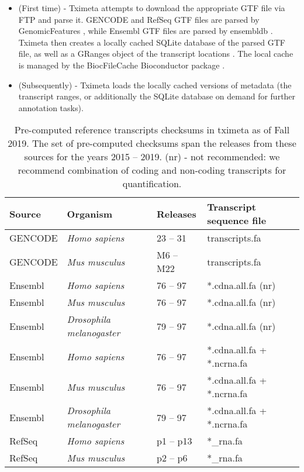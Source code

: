 \documentclass[12pt]{article} \usepackage[utf8]{inputenc}
\begin{document}
\begin{itemize}
\item (First time) - Tximeta attempts to download the appropriate GTF
  file via FTP and parse it. GENCODE and RefSeq GTF files are parsed
  by GenomicFeatures \citep{granges}, while Ensembl GTF files are
  parsed by ensembldb \citep{ensembldb}. Tximeta then creates a
  locally cached SQLite database of the parsed GTF file, as well as a
  GRanges object of the transcript locations \citep{granges}. The
  local cache is managed by the BiocFileCache Bioconductor package
  \citep{biocfilecache}.
\item (Subsequently) - Tximeta loads the locally cached versions of
  metadata (the transcript ranges, or additionally the SQLite database
  on demand for further annotation tasks).
\end{itemize}

\begin{table}[t]
\centering
\begin{tabular}{llll} 
\hline Source & Organism & Releases & Transcript sequence file
\\ \hline\hline GENCODE & \textit{Homo sapiens} & 23 -- 31 &
transcripts.fa \\ GENCODE & \textit{Mus musculus} & M6 -- M22 &
transcripts.fa \\ \hline Ensembl & \textit{Homo sapiens} & 76 -- 97 &
*.cdna.all.fa (nr) \\ Ensembl & \textit{Mus musculus} & 76 -- 97 &
*.cdna.all.fa (nr) \\ Ensembl & \textit{Drosophila melanogaster} & 79
-- 97 & *.cdna.all.fa (nr) \\ \hline Ensembl & \textit{Homo sapiens} &
76 -- 97 & *.cdna.all.fa + *.ncrna.fa \\ Ensembl & \textit{Mus
  musculus} & 76 -- 97 & *.cdna.all.fa + *.ncrna.fa \\ Ensembl &
\textit{Drosophila melanogaster} & 79 -- 97 & *.cdna.all.fa +
*.ncrna.fa \\ \hline RefSeq & \textit{Homo sapiens} & p1 -- p13 &
*\_rna.fa \\ RefSeq & \textit{Mus musculus} & p2 -- p6 & *\_rna.fa
\\ \hline
\end{tabular}
\caption{Pre-computed reference transcripts checksums in tximeta as of
  Fall 2019. The set of pre-computed checksums span the releases from
  these sources for the years 2015 -- 2019. (nr) - not recommended: we
  recommend combination of coding and non-coding transcripts for
  quantification.}
\label{tab1}
\end{table}
\end{document}
